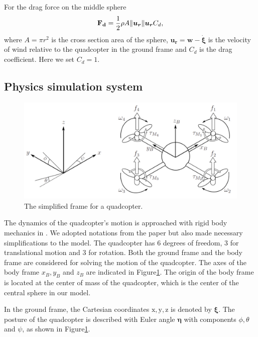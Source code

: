For the drag force on the middle sphere 
\begin{equation}
\label{sphereDrag}
\mathbf{F_{d}}=\frac{1}{2}\rho A \norm{\boldsymbol{u_r}} \boldsymbol{u_r} C_{d},
\end{equation}where $A=\pi r^{2}$ is the cross section area of the sphere, $\boldsymbol{u_r}=\boldsymbol{w}-\dot{\boldsymbol{\xi}}$ is the velocity of wind relative to the quadcopter in the ground frame and $C_{d}$ is the drag coefficient. Here we set $C_{d}=1.$

\subsection{Physics simulation system}

\begin{figure}[htbp]
\centering
\includegraphics[width= 0.7\linewidth, angle =0]{Images/Model.png}
\caption{The simplified frame for a quadcopter.}
\label{fig:model}
\end{figure}
The dynamics of the quadcopter's motion is approached with rigid body mechanics in \cite{bib2}. We adopted notations from the paper but also made necessary simplifications to the model. The quadcopter has 6 degrees of freedom, 3 for translational motion and 3 for rotation.
Both the ground frame and the body frame are considered for solving the motion of the quadcopter. The axes of the body frame $x_B, y_B$ and $z_B$ are indicated in Figure\ref{fig:model}. The origin of the body frame is located at the center of mass of the quadcopter, which is the center of the central sphere in our model.

In the ground frame, the Cartesian coordinates $\mathrm{x}, \mathrm{y}, \mathrm{z}$ is denoted by $\boldsymbol{\xi}$. The posture of the quadcopter is described with Euler angle $\boldsymbol{\eta}$ with components $\phi, \theta$ and $\psi$, as shown in Figure\ref{fig:model}.

